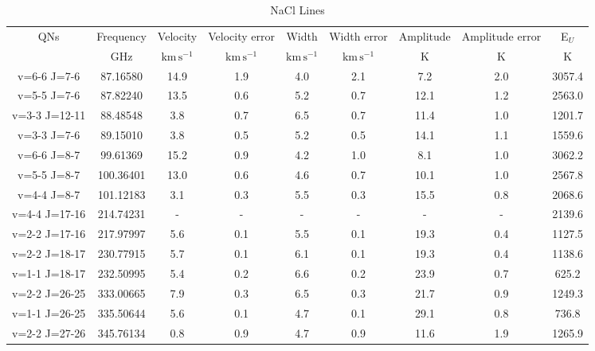 \begin{table*}[htp]
\centering
\caption{NaCl Lines}
\begin{tabular}{ccccccccc}
\label{tab:NaCl_salt_lines}
QNs & Frequency & Velocity & Velocity error & Width & Width error & Amplitude & Amplitude error & E$_U$ \\
 & $\mathrm{GHz}$ & $\mathrm{km\,s^{-1}}$ & $\mathrm{km\,s^{-1}}$ & $\mathrm{km\,s^{-1}}$ & $\mathrm{km\,s^{-1}}$ & $\mathrm{K}$ & $\mathrm{K}$ & $\mathrm{K}$ \\
\hline
v=6-6 J=7-6 & 87.16580 & 14.9 & 1.9 & 4.0 & 2.1 & 7.2 & 2.0 & 3057.4 \\
v=5-5 J=7-6 & 87.82240 & 13.5 & 0.6 & 5.2 & 0.7 & 12.1 & 1.2 & 2563.0 \\
v=3-3 J=12-11 & 88.48548 & 3.8 & 0.7 & 6.5 & 0.7 & 11.4 & 1.0 & 1201.7 \\
v=3-3 J=7-6 & 89.15010 & 3.8 & 0.5 & 5.2 & 0.5 & 14.1 & 1.1 & 1559.6 \\
v=6-6 J=8-7 & 99.61369 & 15.2 & 0.9 & 4.2 & 1.0 & 8.1 & 1.0 & 3062.2 \\
v=5-5 J=8-7 & 100.36401 & 13.0 & 0.6 & 4.6 & 0.7 & 10.1 & 1.0 & 2567.8 \\
v=4-4 J=8-7 & 101.12183 & 3.1 & 0.3 & 5.5 & 0.3 & 15.5 & 0.8 & 2068.6 \\
v=4-4 J=17-16 & 214.74231 & - & - & - & - & - & - & 2139.6 \\
v=2-2 J=17-16 & 217.97997 & 5.6 & 0.1 & 5.5 & 0.1 & 19.3 & 0.4 & 1127.5 \\
v=2-2 J=18-17 & 230.77915 & 5.7 & 0.1 & 6.1 & 0.1 & 19.3 & 0.4 & 1138.6 \\
v=1-1 J=18-17 & 232.50995 & 5.4 & 0.2 & 6.6 & 0.2 & 23.9 & 0.7 & 625.2 \\
v=2-2 J=26-25 & 333.00665 & 7.9 & 0.3 & 6.5 & 0.3 & 21.7 & 0.9 & 1249.3 \\
v=1-1 J=26-25 & 335.50644 & 5.6 & 0.1 & 4.7 & 0.1 & 29.1 & 0.8 & 736.8 \\
v=2-2 J=27-26 & 345.76134 & 0.8 & 0.9 & 4.7 & 0.9 & 11.6 & 1.9 & 1265.9 \\
\hline
\end{tabular}

\par 
\end{table*}
